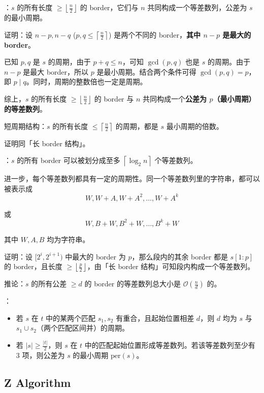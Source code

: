 ：$s$ 的所有长度 $\geq \left\lfloor\frac{n}{2}\right\rfloor$ 的 border，它们与 $n$ 共同构成一个等差数列，公差为 $s$ 的最小周期。

证明：设 $n - p, n - q$ ($p, q \leq \left\lceil \frac{n}{2} \right\rceil$) 是两个不同的 border，\textbf{其中 $n - p$ 是最大的 border}。

已知 $p, q$ 是 $s$ 的周期，由于 $p + q \leq n$，可知 $\gcd(p, q)$ 也是 $s$ 的周期。由于 $n - p$ 是最大 border，所以 $p$ 是最小周期。结合两个条件可得 $\gcd(p, q) = p$，即 $p \mid q$。同时，周期的整数倍也一定是周期。

综上，$s$ 的所有长度 $\geq \left\lfloor\frac{n}{2}\right\rfloor$ 的 border 与 $n$ 共同构成一个\textbf{公差为 $p$（最小周期）的等差数列}。

\begin{quoteblock}
短周期结构：$s$ 的所有长度 $\leq \left\lceil \frac{n}{2} \right\rceil$ 的周期，都是 $s$ 最小周期的倍数。

证明同「长 border 结构」。
\end{quoteblock}

：$s$ 的所有 border 可以被划分成至多 $\left\lceil \log_2 n \right\rceil$ 个等差数列。

进一步，每个等差数列都具有一定的周期性。同一个等差数列里的字符串，都可以被表示成
\[
W, W + A, W + A^2, \dots, W + A^k
\]

或
\[
W, B + W, B^2 + W, \dots, B^k + W
\]

其中 $W, A, B$ 均为字符串。

证明：设 $[2^i, 2^{i + 1})$ 中最大的 border 为 $p$，那么段内的其余 border 都是 $s[1 : p]$ 的 border，且长度 $\geq \left\lfloor \frac{p}{2} \right\rfloor$，由「长 border 结构」可知段内构成一个等差数列。

推论：$s$ 的所有公差 $\geq d$ 的 border 的等差数列总大小是 $\mathcal{O}\left( \frac{n}{d} \right)$ 的。

：

\begin{itemize}
    \item 若 $s$ 在 $t$ 中的某两个匹配 $s_1, s_2$ 有重合，且起始位置相差 $d$，则 $d$ 均为 $s$ 与 $s_1 \cup s_2$（两个匹配区间并）的周期。
    \item 若 $|s| \geq \frac{|t|}{2}$，则 $s$ 在 $t$ 中的匹配起始位置形成等差数列。若该等差数列至少有 $3$ 项，则公差为 $s$ 的最小周期 $\mathrm{per}(s)$。
\end{itemize}

\subsection{Z Algorithm}

